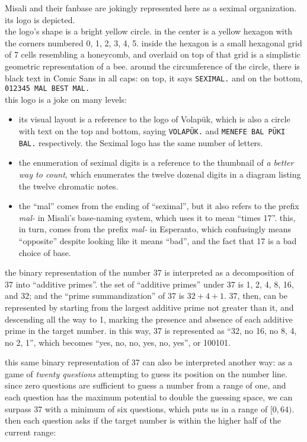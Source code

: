 \documentclass[../footnotes.tex]{subfiles}
\begin{document}

 Misali and their fanbase are jokingly represented here as a seximal organization. its logo is depicted. \\ the logo's shape is a bright yellow circle. in the center is a yellow hexagon with the corners numbered 0, 1, 2, 3, 4, 5. inside the hexagon is a small hexagonal grid of 7 cells resembling a honeycomb, and overlaid on top of that grid is a simplistic geometric representation of a bee. around the circumference of the circle, there is black text in Comic Sans in all caps: on top, it says {\tt SEXIMAL.} and on the bottom, {\tt 012345 MAL BEST MAL.} \\ this logo is a joke on many levels:

\begin{itemize}
	\item its visual layout is a reference to the logo of Volap\"uk, which is also a circle with text on the top and bottom, saying {\tt VOLAP\"UK.} and {\tt MENEFE BAL P\"UKI BAL.} respectively. the Seximal logo has the same number of letters.
	\item the enumeration of seximal digits is a reference to the thumbnail of {\it a better way to count}, which enumerates the twelve dozenal digits in a diagram listing the twelve chromatic notes.
	\item the ``mal'' comes from the ending of ``seximal'', but it also refers to the prefix {\it mal-} in Misali's base-naming system, which uses it to mean ``times 17''. this, in turn, comes from the prefix {\it mal-} in Esperanto, which confusingly means ``opposite'' despite looking like it means ``bad'', and the fact that 17 is a bad choice of base.
\end{itemize}

 the binary representation of the number 37 is interpreted as a decomposition of 37 into ``additive primes''. the set of ``additive primes'' under 37 is 1, 2, 4, 8, 16, and 32; and the ``prime summandization'' of 37 is $32 + 4 + 1$. 37, then, can be represented by starting from the largest additive prime not greater than it, and descending all the way to 1, marking the presence and absence of each additive prime in the target number. in this way, 37 is represented as ``32, no 16, no 8, 4, no 2, 1'', which becomes ``yes, no, no, yes, no, yes'', or 100101.

 this same binary representation of 37 can also be interpreted another way: as a game of {\it twenty questions} attempting to guess its position on the number line. since zero questions are sufficient to guess a number from a range of one, and each question has the maximum potential to double the guessing space, we can surpass 37 with a minimum of six questions, which puts us in a range of $[0, 64)$. then each question asks if the target number is within the higher half of the current range:
\end{document}
